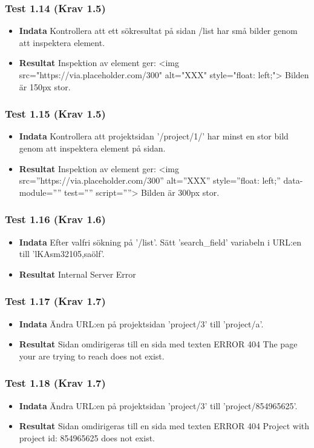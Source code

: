 \documentclass{TDP003mall}
\begin{document}
\subsubsection*{Test 1.14 (Krav 1.5)}
\begin{itemize}
\item[]\textbf{Indata} Kontrollera att ett sökresultat på sidan /list har små bilder genom att inspektera element. 
\item[]\textbf{Resultat} Inspektion av element ger: <img src="https://via.placeholder.com/300" alt="XXX" style="float: left;"> Bilden är 150px stor.
\end{itemize}
\subsubsection*{Test 1.15 (Krav 1.5)}
\begin{itemize}
\item[]\textbf{Indata} Kontrollera att projektsidan '/project/1/' har minst en stor bild genom att inspektera element på sidan.
\item[]\textbf{Resultat} Inspektion av element ger: <img src=''https://via.placeholder.com/300'' alt=''XXX'' style=''float: left;'' data-module='''' test='''' script=''''> Bilden är 300px stor.
\end{itemize}
\subsubsection*{Test 1.16 (Krav 1.6)}
\begin{itemize}
\item[]\textbf{Indata} Efter valfri sökning på '/list'. Sätt 'search\_field' variabeln i URL:en till 'lKAsm32105,saölf'.
\item[]\textbf{Resultat} Internal Server Error
\end{itemize}
\subsubsection*{Test 1.17 (Krav 1.7)}
\begin{itemize}
\item[]\textbf{Indata} Ändra URL:en på projektsidan 'project/3' till 'project/a'.
\item[]\textbf{Resultat} Sidan omdirigeras till en sida med texten ERROR 404 The page your are trying to reach does not exist.
\end{itemize}
\subsubsection*{Test 1.18 (Krav 1.7)}
\begin{itemize}
\item[]\textbf{Indata} Ändra URL:en på projektsidan 'project/3' till 'project/854965625'.
\item[]\textbf{Resultat} Sidan omdirigeras till en sida med texten ERROR 404 Project with project id: 854965625 does not exist. 
\end{itemize}
\end{document}

